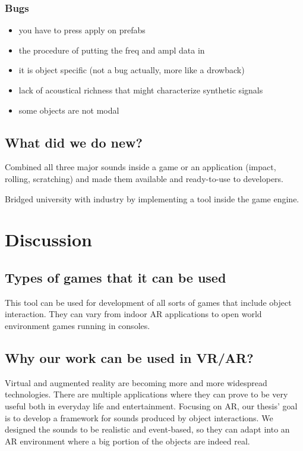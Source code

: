 \subsubsection{Bugs}
\begin{itemize}
\item you have to press apply on prefabs
\item the procedure of putting the freq and ampl data in
\item it is object specific (not a bug actually, more like a drowback)
\item lack of acoustical richness that might characterize synthetic signals \cite{giordano2006material}
\item some objects are not modal
\end{itemize}

\subsection{What did we do new?}
Combined all three major sounds inside a game or an application (impact, rolling, scratching) and made them available and ready-to-use to developers.

Bridged university with industry by implementing a tool inside the game engine.

\section{Discussion}

\subsection{Types of games that it can be used}
This tool can be used for development of all sorts of games that include object interaction. They can vary from indoor AR applications to open world environment games running in consoles. 

\subsection{Why our work can be used in VR/AR?}
Virtual and augmented reality are becoming more and more widespread technologies. There are multiple applications where they can prove to be very useful both in everyday life and entertainment. Focusing on AR, our thesis' goal is to develop a framework for sounds produced by object interactions. We designed the sounds to be realistic and event-based, so they can adapt into an AR environment where a big portion of the objects are indeed real.


